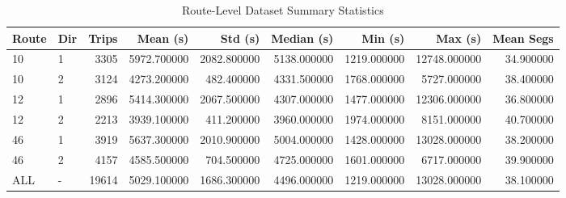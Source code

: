 \begin{table}
\caption{Route-Level Dataset Summary Statistics}
\label{tab:route_level_summary}
\begin{tabular}{llrrrrrrr}
\toprule
Route & Dir & Trips & Mean (s) & Std (s) & Median (s) & Min (s) & Max (s) & Mean Segs \\
\midrule
10 & 1 & 3305 & 5972.700000 & 2082.800000 & 5138.000000 & 1219.000000 & 12748.000000 & 34.900000 \\
10 & 2 & 3124 & 4273.200000 & 482.400000 & 4331.500000 & 1768.000000 & 5727.000000 & 38.400000 \\
12 & 1 & 2896 & 5414.300000 & 2067.500000 & 4307.000000 & 1477.000000 & 12306.000000 & 36.800000 \\
12 & 2 & 2213 & 3939.100000 & 411.200000 & 3960.000000 & 1974.000000 & 8151.000000 & 40.700000 \\
46 & 1 & 3919 & 5637.300000 & 2010.900000 & 5004.000000 & 1428.000000 & 13028.000000 & 38.200000 \\
46 & 2 & 4157 & 4585.500000 & 704.500000 & 4725.000000 & 1601.000000 & 6717.000000 & 39.900000 \\
ALL & - & 19614 & 5029.100000 & 1686.300000 & 4496.000000 & 1219.000000 & 13028.000000 & 38.100000 \\
\bottomrule
\end{tabular}
\end{table}
